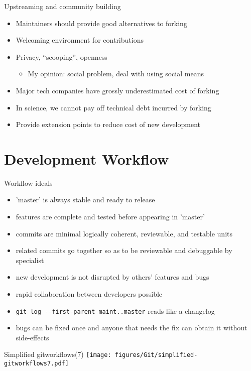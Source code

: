 \documentclass{beamer}
\begin{document}
\begin{frame}{Upstreaming and community building}
  \begin{itemize}
  \item Maintainers should provide good alternatives to forking
  \item Welcoming environment for contributions
  \item Privacy, ``scooping'', openness
    \begin{itemize}
    \item My opinion: social problem, deal with using social means
    \end{itemize}
  \item Major tech companies have grossly underestimated cost of forking
  \item In science, we cannot pay off technical debt incurred by forking
  \item Provide extension points to reduce cost of new development
  \end{itemize}
\end{frame}

\section{Development Workflow}
\begin{frame}{Workflow ideals}
  \begin{itemize}
  \item 'master' is always stable and ready to release
  \item features are complete and tested before appearing in 'master'
  \item commits are minimal logically coherent, reviewable, and testable units
  \item related commits go together so as to be reviewable and debuggable by specialist
  \item new development is not disrupted by others' features and bugs
  \item rapid collaboration between developers possible
  \item \texttt{git log -{}-first-parent maint..master} reads like a changelog
  \item bugs can be fixed once and anyone that needs the fix can obtain it without side-effects
  \end{itemize}
\end{frame}

\begin{frame}{Simplified gitworkflows(7)}
  \texttt{[image: figures/Git/simplified-gitworkflows7.pdf]}
\end{frame}
\end{document}
